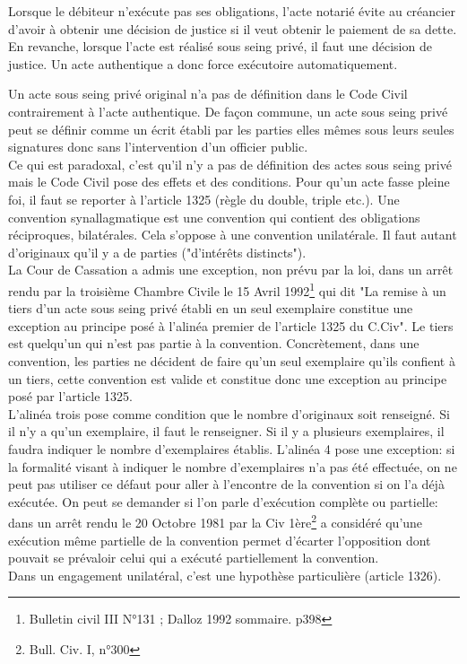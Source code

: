 Lorsque le débiteur n'exécute pas ses obligations, l'acte notarié évite au créancier d'avoir à obtenir une décision de justice si il veut obtenir le paiement de sa dette. En revanche, lorsque l'acte est réalisé sous seing privé, il faut une décision de justice. Un acte authentique a donc force exécutoire automatiquement. 


Un acte sous seing privé original n'a pas de définition dans le Code Civil contrairement à l'acte authentique. De façon commune, un acte sous seing privé peut se définir comme un écrit établi par les parties elles mêmes sous leurs seules signatures donc sans l'intervention d'un officier public. \\
Ce qui est paradoxal, c'est qu'il n'y a pas de définition des actes sous seing privé mais le Code Civil pose des effets et des conditions. Pour qu'un acte fasse pleine foi, il faut se reporter à l'article 1325 (règle du double, triple etc.). Une convention synallagmatique est une convention qui contient des obligations réciproques, bilatérales. Cela s'oppose à une convention unilatérale.  Il faut autant d'originaux qu'il y a de parties ("d'intérêts distincts"). \\ 
La Cour de Cassation a admis une exception, non prévu par la loi, dans un arrêt rendu par la troisième Chambre Civile le 15 Avril 1992\footnote{Bulletin civil III N°131 ; Dalloz 1992 sommaire. p398} qui dit "La remise à un tiers d'un acte sous seing privé établi en un seul exemplaire constitue une exception au principe posé à l'alinéa premier de l'article 1325 du C.Civ". Le tiers est quelqu'un qui n'est pas partie à la convention. Concrètement, dans une convention, les parties ne décident de faire qu'un seul exemplaire qu'ils confient à un tiers, cette convention est valide et constitue donc une exception au principe posé par l'article 1325. \\
L'alinéa trois pose comme condition que le nombre d'originaux soit renseigné. Si il n'y a qu'un exemplaire, il faut le renseigner. Si il y a plusieurs exemplaires, il faudra indiquer le nombre d'exemplaires établis. L'alinéa 4 pose une exception: si la formalité visant à indiquer le nombre d'exemplaires n'a pas été effectuée, on ne peut pas utiliser ce défaut pour aller à l'encontre de la convention si on l'a déjà exécutée. On peut se demander si l'on parle d'exécution complète ou partielle: dans un arrêt rendu le 20 Octobre 1981 par la Civ 1ère\footnote{Bull. Civ. I, n°300} a considéré qu'une exécution même partielle de la convention permet d'écarter l'opposition dont pouvait se prévaloir celui qui a exécuté partiellement la convention. \\
Dans un engagement unilatéral, c'est une hypothèse particulière (article 1326). 



